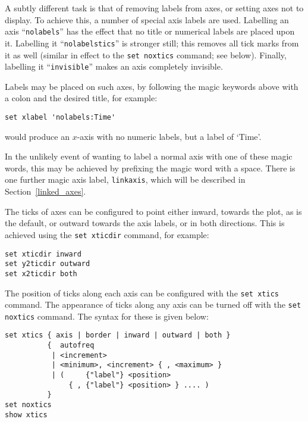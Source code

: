 A subtly different task is that of removing labels from axes, or setting axes
not to display. To achieve this, a number of special axis labels are used.
Labelling an axis ``\texttt{nolabels}'' has the effect that no title or numerical
labels are placed upon it. Labelling it\label{nolabelstics}
``\texttt{nolabelstics}'' is stronger still; this removes all tick marks from it as well
(similar in effect to the \texttt{set noxtics} command; see below). Finally,
labelling it ``\texttt{invisible}'' makes an axis completely invisible.

Labels may be placed on such axes, by following the magic keywords above with a
colon and the desired title, for example:

\begin{verbatim}
set xlabel 'nolabels:Time'
\end{verbatim}

\noindent would produce an $x$-axis with no numeric labels, but a label of
`Time'.

In the unlikely event of wanting
to label a normal axis with one of these magic words, this may be achieved by prefixing the magic
word with a space. There is one further magic axis label, \texttt{linkaxis},
which will be described in Section~\ref{linked_axes}.

The ticks of axes can be configured to point either inward, towards the plot,
as is the default, or outward towards the axis labels, or in both directions.
This is achieved using the \texttt{set xticdir} command, for example:

\begin{verbatim}
set xticdir inward
set y2ticdir outward
set x2ticdir both
\end{verbatim}

The position of ticks along each axis can be configured with the \texttt{set
xtics} command. The
appearance of ticks along any axis can be turned off with the \texttt{set
noxtics} command. The
syntax for these is given below:

\begin{verbatim}
set xtics { axis | border | inward | outward | both }
          {  autofreq
           | <increment>
           | <minimum>, <increment> { , <maximum> }
           | (     {"label"} <position>
               { , {"label"} <position> } .... )
          }
set noxtics
show xtics
\end{verbatim}

